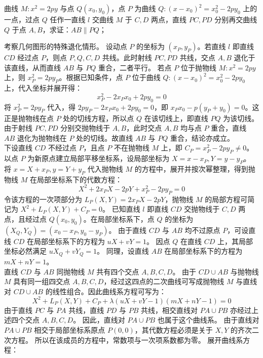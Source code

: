 \begin{example}
曲线 \(M: x^2 = 2py\) 与点 \(Q(x_0,y_0)\)，点 \(P\) 为曲线 \(Q: (x-x_0)^2 = x_0^2 - 2py_0\) 上的一点，过点 \(Q\) 任作一直线 \(l\) 交曲线 \(M\) 于 \(C,D\) 两点，直线 \(PC,PD\) 分别再交曲线 \(Q\) 于点 \(A,B\)，求证：\(AB \parallel PQ\)；
\end{example}
\begin{solution}
考察几何图形的特殊退化情形。
设动点 $P$ 的坐标为 $(x_P, y_P)$。若直线 $l$ 即直线 $CD$ 经过点 $P$，则点 $P, Q, C, D$ 共线。此时射线 $PC, PD$ 共线，交点 $A, B$ 退化于该直线，从而直线 $AB$ 与 $PQ$ 重合，二者平行。
若点 $P$ 位于抛物线 $M: x^2 = 2py$ 上，则 $x_P^2 = 2py_P$。根据已知条件，点 $P$ 位于曲线 $Q: (x - x_0)^2 = x_0^2 - 2py_0$ 上，代入坐标并展开得：
$$ x_P^2 - 2x_P x_0 + 2py_0 = 0 $$
将 $x_P^2 = 2py_P$ 代入，得 $2py_P - 2x_P x_0 + 2py_0 = 0$，即 $x_P x_0 - p(y_P + y_0) = 0$。这正是抛物线在点 $P$ 处的切线方程，所以点 $Q$ 在该切线上，即直线 $PQ$ 为该切线。由于射线 $PC, PD$ 分别交抛物线于 $A, B$，此时交点 $A, B$ 均与点 $P$ 重合，直线 $AB$ 退化为抛物线在 $P$ 处的切线。故直线 $AB$ 与 $PQ$ 重合，结论亦成立。\\
下设直线 $CD$ 不经过点 $P$，且点 $P$ 不在抛物线 $M$ 上，即 $C_P = x_P^2 - 2py_P \neq 0$。
以点 $P$ 为新原点建立局部平移坐标系，设局部坐标为 $X = x - x_P, Y = y - y_P$。
将 $x = X + x_P, y = Y + y_P$ 代入抛物线 $M$ 的方程中，展开并按次幂整理，得到抛物线 $M$ 在局部坐标系下的代数方程：
$$ X^2 + 2x_P X - 2p Y + x_P^2 - 2py_P = 0 $$
令该方程的一次项部分为 $L_P(X, Y) = 2x_P X - 2p Y$，抛物线 $M$ 的局部方程可简记为 $X^2 + L_P(X, Y) + C_P = 0$。
已知直线 $l$ 即直线 $CD$ 交抛物线于 $C, D$ 两点，且经过点 $Q(x_0, y_0)$。在局部坐标系下，点 $Q$ 的坐标为 $(X_Q, Y_Q) = (x_0 - x_P, y_0 - y_P)$。
由于直线 $CD$ 与 $AB$ 均不过原点 $P$，可设直线 $CD$ 在局部坐标系下的方程为 $uX + vY = 1$。
因点 $Q$ 在直线 $CD$ 上，其局部坐标必然满足 $uX_Q + vY_Q = 1$。
同理，设直线 $AB$ 在局部坐标系下的方程为 $mX + nY = 1$。\\
直线 $CD$ 与 $AB$ 同抛物线 $M$ 共有四个交点 $A, B, C, D$。
由于 $CD\cup AB$ 与抛物线 $M$ 具有同一组四交点 $A,B,C,D$，经过这四点的二次曲线可写成抛物线 $M$ 与直线对 $CD \cup AB$ 的线性组合。因此曲线系方程可写为：
$$ X^2 + L_P(X, Y) + C_P + \lambda (uX + vY - 1)(mX + nY - 1) = 0 $$
由于直线 $PC$ 与 $PA$ 共线，直线 $PD$ 与 $PB$ 共线，相交直线对 $PA \cup PB$ 亦经过上述四个交点 $A, B, C, D$。
因此，直线对 $PA \cup PB$ 也属于这个曲线系。
由于直线对 $PA \cup PB$ 相交于局部坐标系原点 $P(0,0)$，其代数方程必须是关于 $X, Y$ 的齐次二次方程。
所以在该成员的方程中，常数项与一次项系数都为零。
展开曲线系方程：

\end{solution}
